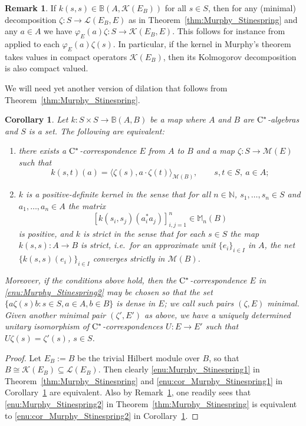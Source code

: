 \documentclass[11 pt, leqno]{amsart}
\numberwithin{equation}{section}
\theoremstyle{plain}
\newtheorem{cor}[thm]{Corollary}
\theoremstyle{definition}
\newtheorem {rem} [thm]{Remark}
\newcommand{\Mat}{\mathbb M} %
\newcommand{\BB}{\mathbb B}
\newcommand{\M}{\mathcal M}
\newcommand{\K}{\mathcal{K}}
\renewcommand{\L}{\mathcal L}
\newcommand{\N}{\mathbb N}
\newcommand{\cst}{\ifmmode\mathrm{C}^*\else{$\mathrm{C}^*$}\fi}
\begin{document}
\begin{rem}\label{rem:compact_valued_kernels}
If $k(s,s)\in \BB(A,\K(E_B))$ for all $s\in S$, then for any (minimal) decomposition $\zeta:S \to \L(E_B,E)$ as in Theorem~\ref{thm:Murphy_Stinespring} and any $a\in A$ we have $\varphi_E(a)\zeta:S \to \K(E_B,E)$. 
This follows for instance from \cite[Proposition 1.3]{katsura2} applied to  each $\varphi_E(a)\zeta(s)$.
In particular, if the kernel in Murphy's theorem takes values in compact operators $\K(E_B)$, then its Kolmogorov decomposition is also compact valued. 
\end{rem}

We will need yet another version of dilation that follows from  Theorem~\ref{thm:Murphy_Stinespring}. 

\begin{cor}\label{cor:Murphy_Stinespring}
Let $k:S \times S \to \BB(A,B)$ be a map where $A$ and $B$ are $\cst$-algebras and $S$ is a set.
The following are equivalent:
\begin{enumerate}
    \item\label{enu:cor_Murphy_Stinespring2} there exists a $\cst$-correspondence $E$ from $A$ to $B$ and a map $\zeta:S \to \M(E)$ such that 
    \[
        k(s,t)(a) = \langle   \zeta(s), a\cdot \zeta(t) \rangle_{\M(B)}, \qquad s, t \in S,\ a \in A;
    \]

    \item\label{enu:cor_Murphy_Stinespring1} $k$ is a \emph{positive-definite kernel} in the sense that for all $n \in \N$, $s_1,\ldots, s_n \in S$ and $a_1, \ldots, a_n \in A$ the matrix
    \[
        [k(s_i,s_j) ( a_i^*a_j)]_{i,j=1}^n \in \Mat_n(B)
    \]
    is positive, %
    and $k$ is \emph{strict} in the sense that for each $s\in S$ the map $k(s,s):A\to B$ is strict, i.e.\ for an approximate unit $\{e_i\}_{i \in I}$ in $A$, the net $\{k(s,s)(e_i)\}_{i \in I}$ converges strictly in $\M(B)$.
\end{enumerate}
Moreover, if the conditions above hold, then the $\cst$-correspondence $E$ in \ref{enu:Murphy_Stinespring2} may be chosen so that the set $\{a\zeta(s)b:s \in S, a\in A, b\in B\}$ is dense in $E$; we call such pairs $(\zeta,E)$ \emph{minimal}. 
Given another minimal pair $(\zeta',E')$ as above, we have a uniquely determined unitary isomorphism of $\cst$-correspondences $U:E \to E'$ such that $U\zeta(s) = \zeta'(s)$, $s \in S$.
\end{cor}
\begin{proof} 
Let $E_B:=B$ be the trivial Hilbert module over $B$, so that $B\cong \K(E_B)\subseteq \L(E_B)$. 
Then clearly \ref{enu:Murphy_Stinespring1} in Theorem~\ref{thm:Murphy_Stinespring} and \ref{enu:cor_Murphy_Stinespring1} in Corollary~\ref{cor:Murphy_Stinespring} are equivalent. 
Also by Remark~\ref{rem:compact_valued_kernels}, one readily sees that  \ref{enu:Murphy_Stinespring2} in Theorem~\ref{thm:Murphy_Stinespring} is equivalent to \ref{enu:cor_Murphy_Stinespring2} in Corollary~\ref{cor:Murphy_Stinespring}. 
\end{proof}
\end{document}
